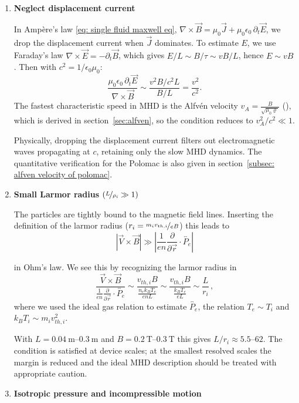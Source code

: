 \begin{enumerate}
\item \textbf{Neglect displacement current}

In Amp\`ere's law \eqref{eq: single fluid maxwell eq}, 
$\nabla\times\vec{B} = \mu_0\vec{J} + \mu_0\epsilon_0\,\partial_t\vec{E}$, 
we drop the displacement current when $\vec{J}$ dominates. 
To estimate $E$, we use Faraday's law $\nabla\times\vec{E}=-\partial_t\vec{B}$, 
which gives $E/L\sim B/\tau\sim vB/L$, hence $E\sim vB$. Then with $c^2=1/\epsilon_0\mu_0$:
\[
    \frac{\mu_0\epsilon_0\,\partial_t\vec{E}}
         {\nabla\times\vec{B}}
    \sim \frac{v^2 B/c^2 L}{B/L}
    = \frac{v^2}{c^2}.
\]
The fastest characteristic speed in MHD is the Alfv\'en 
velocity $v_A = \frac{B}{\sqrt{\mu_0\varrho}}$ (\cite{Freidberg2014, Chen2016}), 
which is derived in section~\ref{sec:alfven}, so the condition reduces to $v_A^2/c^2\ll 1$.

Physically, dropping the displacement current filters out electromagnetic
waves propagating at $c$, retaining only the slow MHD dynamics. 
The quantitative verification for the Polomac is also given in section~\ref{subsec: alfven velocity of polomac}.

\item \textbf{Small Larmor radius} $\left(\nicefrac{L}{\rho_i} \gg 1\right)$

The particles are tightly bound to the magnetic field lines.
Inserting the definition of the larmor radius ($r_i = \nicefrac{m_i v_{th, i}}{eB}$)
this leads to
\[
\left|\vec{V} \times \vec{B}\right| \gg \left|\frac{1}{en} \frac{\partial}{\partial \vec{r}} \cdot \overleftrightarrow{P_e}\right|
\]

in Ohm's law. We see this by recognizing the larmor radius in
\[
\frac{\vec{V}\times\vec{B}}{\frac{1}{en} \frac{\partial}{\partial \vec{r}} \cdot \overleftrightarrow{P_e}}
\sim \frac{v_{th, i} B}{\frac{n_e k_B T_e}{e n L}} \sim \frac{v_{th, i} B}{\frac{ k_B T_e}{e L}} \sim \frac{L}{r_i}  \, ,
\]
where we used the ideal gas relation to estimate $\overleftrightarrow{P_e}$, the relation $T_e \sim T_i$ and $k_B T_i \sim m_i v_{th,i}^2$.

With $L=\SIrange{0.04}{0.3}{\meter}$ and $B=\SIrange{0.2}{0.3}{\tesla}$ this gives $L/r_i\approx \numrange{5.5}{62}$.
The condition is satisfied at device scales; at the smallest resolved
scales the margin is reduced and the ideal MHD description should be
treated with appropriate caution.


\item \textbf{Isotropic pressure and incompressible motion}


\end{enumerate}
